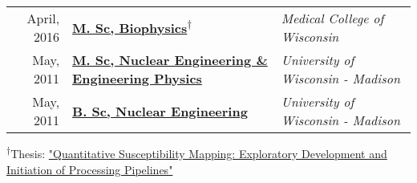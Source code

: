 %
%



\begin{minipage}{\textwidth}
    \begin{tabular}{r|ll}
	April, 2016 &	\href{https://app.box.com/s/62ffckadt53x8k93p9gp6ylbpqj9vscw}{\textbf{M. Sc, Biophysics}}\textsuperscript{$\dagger$} & \emph{Medical College of Wisconsin} \\ %
	May, 2011 & \href{https://app.box.com/s/yyxi60lex92ovm7dus1d5xu9xshdqd91}{\textbf{M. Sc, Nuclear Engineering \& Engineering Physics}} & \emph{University of Wisconsin - Madison} \\ %
	May, 2011 & \href{https://app.box.com/s/yyxi60lex92ovm7dus1d5xu9xshdqd91}{\textbf{B. Sc, Nuclear Engineering}} & \emph{University of Wisconsin - Madison}\\ %
    \end{tabular}
\end{minipage}

\begin{minipage}{\textwidth}
	\textsuperscript{$\dagger$}Thesis: \href{https://app.box.com/s/o8kksc6n51qpjzc3clfa127xtdfkayzd}{\normalsize"Quantitative Susceptibility Mapping: Exploratory Development and Initiation of Processing Pipelines"}
\end{minipage}

